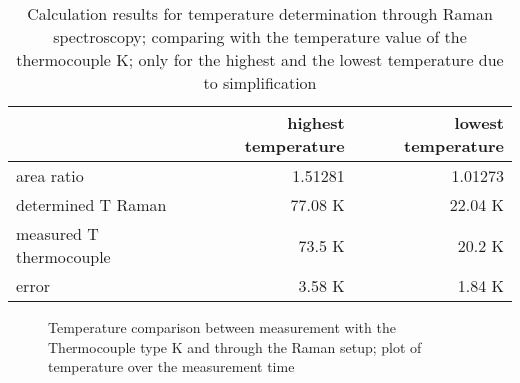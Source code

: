 \begin{table}[!htb]
    \centering
    \small
    \caption[Temperature calculation results comparison]{Calculation results for temperature determination through Raman spectroscopy; comparing with the temperature value of the thermocouple K; only for the highest and the lowest temperature due to simplification}
    \label{tab:temp}
    \vspace{12pt}
    \begin{tabular}{|l|r|r|}
        \hline %
        \rowcolor{lightgray}                & highest temperature   & lowest temperature \\ \hline \hline %
        area ratio                          & 1.51281               & 1.01273 \\ \hline
        determined $\mathrm{T}$ Raman       & 77.08 $\mathrm{K}$    & 22.04 $\mathrm{K}$ \\ \hline
        measured $\mathrm{T}$ thermocouple  & 73.5 $\mathrm{K}$     & 20.2 $\mathrm{K}$\\ \hline
        error                               & 3.58 $\mathrm{K}$     & 1.84 $\mathrm{K}$ \\ \hline        
    \end{tabular}
\end{table}

\begin{figure}[!htb]
    \centering
    
    \caption[Temperature comparison between Thermocouple and Raman measurement]{Temperature comparison between measurement with the Thermocouple type K and through the Raman setup; plot of temperature over the measurement time}
    \label{fig:plot-temp-time}
\end{figure}

